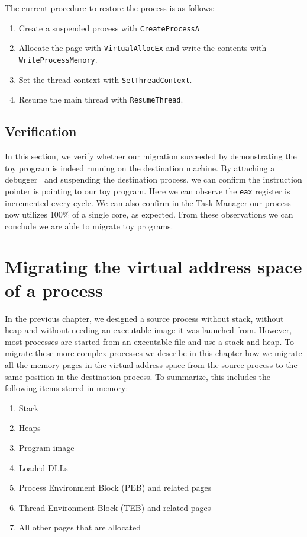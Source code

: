 \documentclass[a4paper, 11pt, english]{report}
\begin{document}

The current procedure to restore the process is as follows:
\begin{enumerate}
	\item Create a suspended process with \texttt{CreateProcessA}
	\item Allocate the page with \texttt{VirtualAllocEx} and write the contents with \texttt{WriteProcessMemory}.
	\item Set the thread context with \texttt{SetThreadContext}.
	\item Resume the main thread with \texttt{ResumeThread}.
\end{enumerate}

\section{Verification}
\label{sec:verification-shellcode}
In this section, we verify whether our migration succeeded by demonstrating the toy program is indeed running on the destination machine.
By attaching a debugger~\cite{x64dbg} and suspending the destination process, we can confirm the instruction pointer is pointing to our toy program. Here we can observe the \texttt{eax} register is incremented every cycle. We can also confirm in the Task Manager our process now utilizes 100\% of a single core, as expected.
From these observations we can conclude we are able to migrate toy programs.


\chapter{Migrating the virtual address space of a process}
\label{ch:memory}
In the previous chapter, we designed a source process without stack, without heap and without needing an executable image it was launched from. However, most processes are started from an executable file and use a stack and heap. To migrate these more complex processes we describe in this chapter how we migrate all the memory pages in the virtual address space from the source process to the same position in the destination process. To summarize, this includes the following items stored in memory:

\begin{enumerate}
	\item Stack
	\item Heaps
	\item Program image
	\item Loaded DLLs
	\item Process Environment Block (PEB) and related pages
	\item Thread Environment Block (TEB) and related pages
	\item All other pages that are allocated
\end{enumerate}
\end{document}

